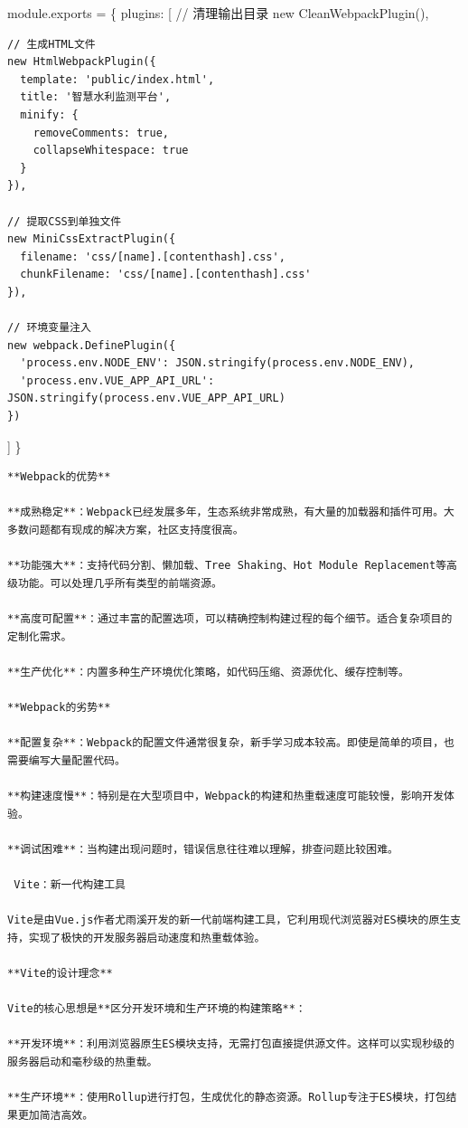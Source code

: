 {{module.exports = \{ plugins: {[} // 清理输出目录 new CleanWebpackPlugin(),

\begin{verbatim}
// 生成HTML文件
new HtmlWebpackPlugin({
  template: 'public/index.html',
  title: '智慧水利监测平台',
  minify: {
    removeComments: true,
    collapseWhitespace: true
  }
}),

// 提取CSS到单独文件
new MiniCssExtractPlugin({
  filename: 'css/[name].[contenthash].css',
  chunkFilename: 'css/[name].[contenthash].css'
}),

// 环境变量注入
new webpack.DefinePlugin({
  'process.env.NODE_ENV': JSON.stringify(process.env.NODE_ENV),
  'process.env.VUE_APP_API_URL': JSON.stringify(process.env.VUE_APP_API_URL)
})
\end{verbatim}

{]} \}

\begin{lstlisting}
**Webpack的优势**

**成熟稳定**：Webpack已经发展多年，生态系统非常成熟，有大量的加载器和插件可用。大多数问题都有现成的解决方案，社区支持度很高。

**功能强大**：支持代码分割、懒加载、Tree Shaking、Hot Module Replacement等高级功能。可以处理几乎所有类型的前端资源。

**高度可配置**：通过丰富的配置选项，可以精确控制构建过程的每个细节。适合复杂项目的定制化需求。

**生产优化**：内置多种生产环境优化策略，如代码压缩、资源优化、缓存控制等。

**Webpack的劣势**

**配置复杂**：Webpack的配置文件通常很复杂，新手学习成本较高。即使是简单的项目，也需要编写大量配置代码。

**构建速度慢**：特别是在大型项目中，Webpack的构建和热重载速度可能较慢，影响开发体验。

**调试困难**：当构建出现问题时，错误信息往往难以理解，排查问题比较困难。

 Vite：新一代构建工具

Vite是由Vue.js作者尤雨溪开发的新一代前端构建工具，它利用现代浏览器对ES模块的原生支持，实现了极快的开发服务器启动速度和热重载体验。

**Vite的设计理念**

Vite的核心思想是**区分开发环境和生产环境的构建策略**：

**开发环境**：利用浏览器原生ES模块支持，无需打包直接提供源文件。这样可以实现秒级的服务器启动和毫秒级的热重载。

**生产环境**：使用Rollup进行打包，生成优化的静态资源。Rollup专注于ES模块，打包结果更加简洁高效。


\end{lstlisting}}}
